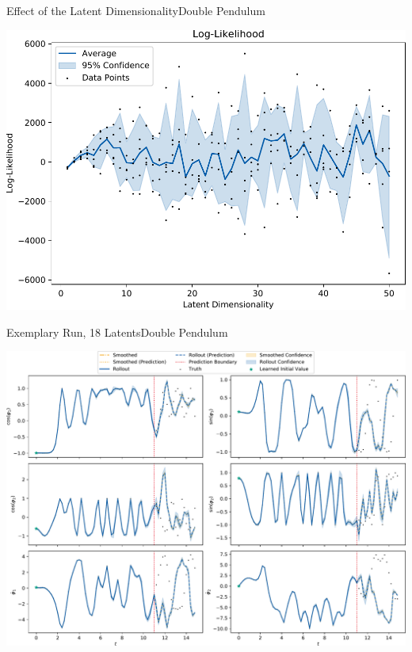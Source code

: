 \documentclass[
	aspectratio=43,
	color={accentcolor=1c},
	logo=false,
	colorframetitle=true,
]{tudabeamer}
\begin{document}
\begin{frame}{Effect of the Latent Dimensionality}{Double Pendulum}
				\vspace{-0.4cm}
				\begin{center}
					\includegraphics[width=0.36\linewidth]{figures/experiments/acrobot-gym/latent-dim/comparison-log-likelihood-mean-vs-latent-dim.pdf}
				\end{center}
			\end{frame}

			\begin{frame}{Exemplary Run, 18 Latents}{Double Pendulum}
				\vspace{-0.45cm}
				\begin{center}
					\includegraphics[width=0.79\linewidth]{figures/experiments/acrobot-gym/rollout-observations-N0.pdf}
				\end{center}
			\end{frame}
\end{document}
